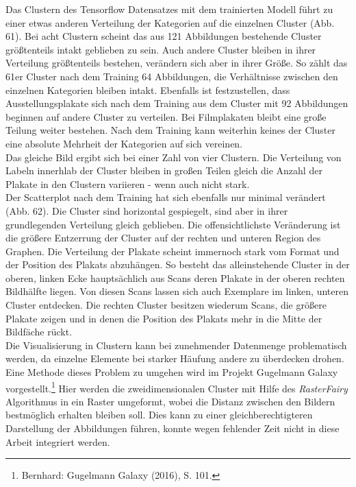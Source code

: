 \documentclass[a4paper,12pt,ngerman]{article}
\begin{document}
Das Clustern des Tensorflow Datensatzes mit dem trainierten Modell führt zu einer etwas anderen Verteilung der Kategorien auf die einzelnen Cluster (Abb. 61). Bei acht Clustern scheint das aus 121 Abbildungen bestehende Cluster größtenteils intakt geblieben zu sein. Auch andere Cluster bleiben in ihrer Verteilung größtenteils bestehen, verändern sich aber in ihrer Größe. So zählt das 61er Cluster nach dem Training 64 Abbildungen, die Verhältnisse zwischen den einzelnen Kategorien bleiben intakt. Ebenfalls ist festzustellen, dass Ausstellungsplakate sich nach dem Training aus dem Cluster mit 92 Abbildungen beginnen auf andere Cluster zu verteilen. Bei Filmplakaten bleibt eine große Teilung weiter bestehen. Nach dem Training kann weiterhin keines der Cluster eine absolute Mehrheit der Kategorien auf sich vereinen. \\
Das gleiche Bild ergibt sich bei einer Zahl von vier Clustern. Die Verteilung von Labeln innerhlab der Cluster bleiben in großen Teilen gleich die Anzahl der Plakate in den Clustern variieren - wenn auch nicht stark. \\
Der Scatterplot nach dem Training hat sich ebenfalls nur minimal verändert (Abb. 62). Die Cluster sind horizontal gespiegelt, sind aber in ihrer grundlegenden Verteilung gleich geblieben. Die offensichtlichste Veränderung ist die größere Entzerrung der Cluster auf der rechten und unteren Region des Graphen. Die Verteilung der Plakate scheint immernoch stark vom Format und der Position des Plakats abzuhängen. So besteht das alleinstehende Cluster in der oberen, linken Ecke hauptsächlich aus Scans deren Plakate in der oberen rechten Bildhälfte liegen. Von diesen Scans lassen sich auch Exemplare im linken, unteren Cluster entdecken. Die rechten Cluster besitzen wiederum Scans, die größere Plakate zeigen und in denen die Position des Plakats mehr in die Mitte der Bildfäche rückt. \\
Die Visualisierung in Clustern kann bei zunehmender Datenmenge problematisch werden, da einzelne Elemente bei starker Häufung andere zu überdecken drohen. Eine Methode dieses Problem zu umgehen wird im Projekt Gugelmann Galaxy vorgestellt.\footnote{Bernhard: Gugelmann Galaxy (2016), S. 101.} Hier werden die zweidimensionalen Cluster mit Hilfe des \textit{RasterFairy} Algorithmus in ein Raster umgeformt, wobei die Distanz zwischen den Bildern bestmöglich erhalten bleiben soll. Dies kann zu einer gleichberechtigteren Darstellung der Abbildungen führen, konnte wegen fehlender Zeit nicht in diese Arbeit integriert werden. \\
\end{document}
